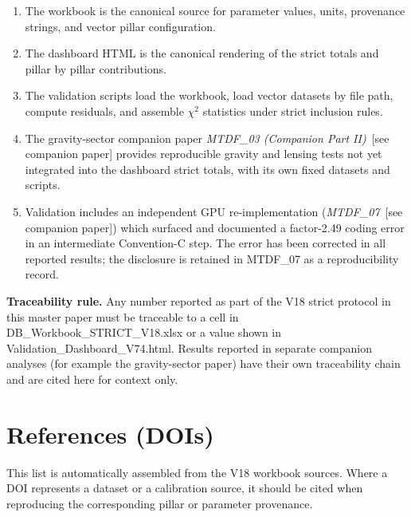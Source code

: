\documentclass[11pt,a4paper]{article}
\begin{document}
\begin{enumerate}
  \item The workbook is the canonical source for parameter values, units, provenance strings, and vector pillar configuration.
  \item The dashboard HTML is the canonical rendering of the strict totals and pillar by pillar contributions.
  \item The validation scripts load the workbook, load vector datasets by file path, compute residuals, and assemble $\chi$$^{2}$ statistics under strict inclusion rules.
  \item The gravity-sector companion paper \textit{MTDF\_\allowbreak{}03 (Companion Part II)}~[see companion paper] provides reproducible gravity and lensing tests not yet integrated into the dashboard strict totals, with its own fixed datasets and scripts.
  \item Validation includes an independent GPU re-implementation (\textit{MTDF\_\allowbreak{}07}~[see companion paper]) which surfaced and documented a factor-2.49 coding error in an intermediate Convention-C step. The error has been corrected in all reported results; the disclosure is retained in MTDF\_\allowbreak{}07 as a reproducibility record.
\end{enumerate}

\begin{mdframed}[linecolor=accent,linewidth=0.5pt,backgroundcolor=callout-bg,leftline=true,rightline=true,topline=true,bottomline=true,innerleftmargin=8pt,innerrightmargin=8pt,innertopmargin=6pt,innerbottommargin=6pt]
\textbf{Traceability rule.} Any number reported as part of the V18 strict protocol in this master paper must be traceable to a cell in DB\_\allowbreak{}Workbook\_\allowbreak{}STRICT\_\allowbreak{}V18.xlsx or a value shown in Validation\_\allowbreak{}Dashboard\_\allowbreak{}V74.html. Results reported in separate companion analyses (for example the gravity-sector paper) have their own traceability chain and are cited here for context only.
\end{mdframed}

\section{References (DOIs)}
\label{sec:sec12}
This list is automatically assembled from the V18 workbook sources. Where a DOI represents a dataset or a calibration source, it should be cited when reproducing the corresponding pillar or parameter provenance.
\end{document}
